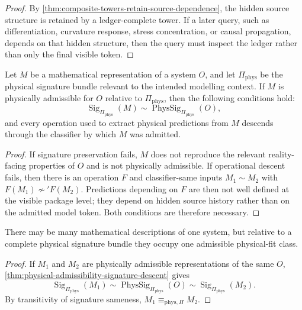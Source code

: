 \begin{proof}
By \autoref{thm:composite-towers-retain-source-dependence}, the hidden source structure is retained by a ledger-complete tower. If a later query, such as differentiation, curvature response, stress concentration, or causal propagation, depends on that hidden structure, then the query must inspect the ledger rather than only the final visible token.
\end{proof}

\begin{theorem}
\label{thm:physical-admissibility-signature-descent}
Let $M$ be a mathematical representation of a system $O$, and let $\Pi_{\mathrm{phys}}$ be the physical signature bundle relevant to the intended modelling context. If $M$ is physically admissible for $O$ relative to $\Pi_{\mathrm{phys}}$, then the following conditions hold:
$$
\operatorname{Sig}_{\Pi_{\mathrm{phys}}}(M)
\sim
\operatorname{PhysSig}_{\Pi_{\mathrm{phys}}}(O),
$$
and every operation used to extract physical predictions from $M$ descends through the classifier by which $M$ was admitted.
\end{theorem}

\begin{proof}
If signature preservation fails, $M$ does not reproduce the relevant reality-facing properties of $O$ and is not physically admissible. If operational descent fails, then there is an operation $F$ and classifier-same inputs $M_1\sim M_2$ with $F(M_1)\not\sim'F(M_2)$. Predictions depending on $F$ are then not well defined at the visible package level; they depend on hidden source history rather than on the admitted model token. Both conditions are therefore necessary.
\end{proof}

\begin{corollary}
\label{cor:physical-representation-unique-up-to-fit}
There may be many mathematical descriptions of one system, but relative to a complete physical signature bundle they occupy one admissible physical-fit class.
\end{corollary}

\begin{proof}
If $M_1$ and $M_2$ are physically admissible representations of the same $O$, \autoref{thm:physical-admissibility-signature-descent} gives
$$
\operatorname{Sig}_{\Pi_{\mathrm{phys}}}(M_1)
\sim
\operatorname{PhysSig}_{\Pi_{\mathrm{phys}}}(O)
\sim
\operatorname{Sig}_{\Pi_{\mathrm{phys}}}(M_2).
$$
By transitivity of signature sameness, $M_1\equiv_{\mathrm{phys},\Pi}M_2$.
\end{proof}

